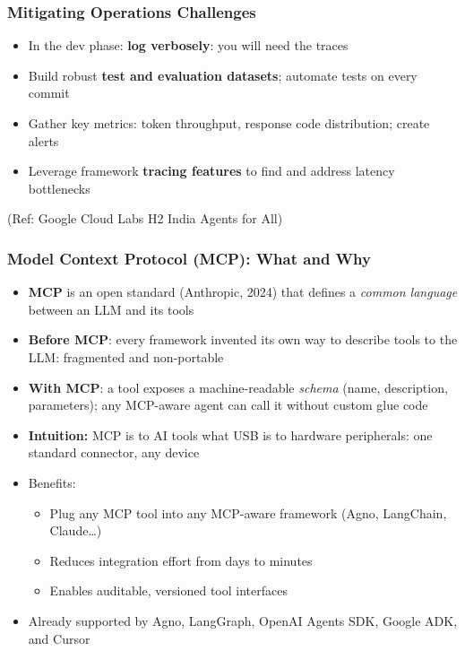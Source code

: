 \begin{frame}[fragile]\frametitle{Mitigating Operations Challenges}
    \begin{itemize}
        \item In the dev phase: \textbf{log verbosely}: you will need the traces
        \item Build robust \textbf{test and evaluation datasets}; automate tests on every commit
        \item Gather key metrics: token throughput, response code distribution; create alerts
        \item Leverage framework \textbf{tracing features} to find and address latency bottlenecks
    \end{itemize}
        {\tiny (Ref: Google Cloud Labs H2 India Agents for All)}
\end{frame}

\begin{frame}[fragile]\frametitle{Model Context Protocol (MCP): What and Why}
      \begin{itemize}
        \item \textbf{MCP} is an open standard (Anthropic, 2024) that defines a \emph{common language} between an LLM and its tools
        \item \textbf{Before MCP}: every framework invented its own way to describe tools to the LLM: fragmented and non-portable
        \item \textbf{With MCP}: a tool exposes a machine-readable \emph{schema} (name, description, parameters); any MCP-aware agent can call it without custom glue code
        \item \textbf{Intuition:} MCP is to AI tools what USB is to hardware peripherals: one standard connector, any device
        \item Benefits:
        \begin{itemize}
            \item Plug any MCP tool into any MCP-aware framework (Agno, LangChain, Claude\ldots)
            \item Reduces integration effort from days to minutes
            \item Enables auditable, versioned tool interfaces
        \end{itemize}
        \item Already supported by Agno, LangGraph, OpenAI Agents SDK, Google ADK, and Cursor
      \end{itemize}
\end{frame}

